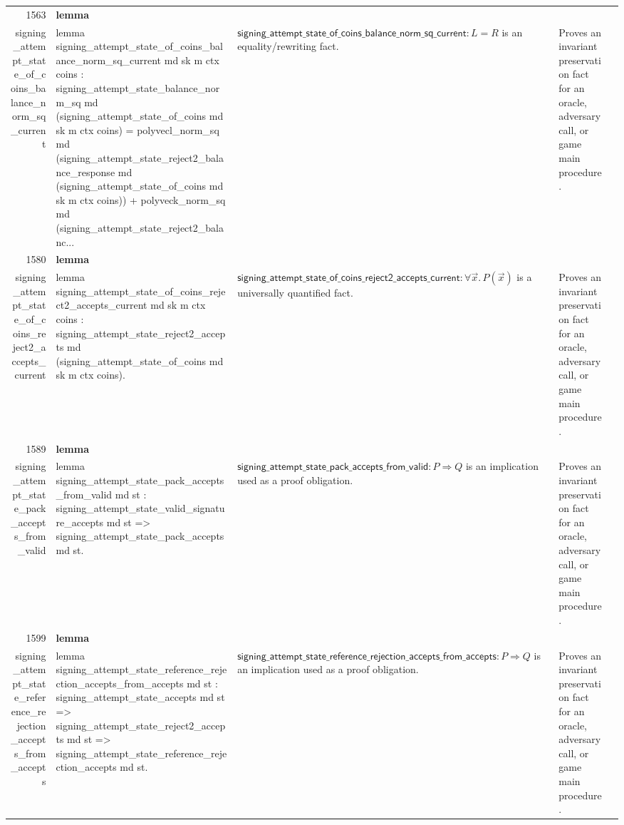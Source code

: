 \documentclass[10pt]{article}
\newcommand{\ec}[1]{\begingroup\ttfamily\scriptsize #1\endgroup}
\begin{document}
\begin{longtable}{r L{0.17\textwidth} L{0.26\textwidth} L{0.27\textwidth} L{0.20\textwidth}}
1563 & \textbf{lemma}\\\ec{signing\_attempt\_state\_of\_coins\_balance\_norm\_sq\_current} & \ec{lemma signing\_attempt\_state\_of\_coins\_balance\_norm\_sq\_current md sk m ctx coins : signing\_attempt\_state\_balance\_norm\_sq md (signing\_attempt\_state\_of\_coins md sk m ctx coins) = polyvecl\_norm\_sq md (signing\_attempt\_state\_reject2\_balance\_response md (signing\_attempt\_state\_of\_coins md sk m ctx coins)) + polyveck\_norm\_sq md (signing\_attempt\_state\_reject2\_balanc...} & \(\mathsf{signing\_attempt\_state\_of\_coins\_balance\_norm\_sq\_current} : L = R\) is an equality/rewriting fact. & Proves an invariant preservation fact for an oracle, adversary call, or game main procedure. \\
1580 & \textbf{lemma}\\\ec{signing\_attempt\_state\_of\_coins\_reject2\_accepts\_current} & \ec{lemma signing\_attempt\_state\_of\_coins\_reject2\_accepts\_current md sk m ctx coins : signing\_attempt\_state\_reject2\_accepts md (signing\_attempt\_state\_of\_coins md sk m ctx coins).} & \(\mathsf{signing\_attempt\_state\_of\_coins\_reject2\_accepts\_current} : \forall \vec{x}.\, P(\vec{x})\) is a universally quantified fact. & Proves an invariant preservation fact for an oracle, adversary call, or game main procedure. \\
1589 & \textbf{lemma}\\\ec{signing\_attempt\_state\_pack\_accepts\_from\_valid} & \ec{lemma signing\_attempt\_state\_pack\_accepts\_from\_valid md st : signing\_attempt\_state\_valid\_signature\_accepts md st => signing\_attempt\_state\_pack\_accepts md st.} & \(\mathsf{signing\_attempt\_state\_pack\_accepts\_from\_valid} : P \Rightarrow Q\) is an implication used as a proof obligation. & Proves an invariant preservation fact for an oracle, adversary call, or game main procedure. \\
1599 & \textbf{lemma}\\\ec{signing\_attempt\_state\_reference\_rejection\_accepts\_from\_accepts} & \ec{lemma signing\_attempt\_state\_reference\_rejection\_accepts\_from\_accepts md st : signing\_attempt\_state\_accepts md st => signing\_attempt\_state\_reject2\_accepts md st => signing\_attempt\_state\_reference\_rejection\_accepts md st.} & \(\mathsf{signing\_attempt\_state\_reference\_rejection\_accepts\_from\_accepts} : P \Rightarrow Q\) is an implication used as a proof obligation. & Proves an invariant preservation fact for an oracle, adversary call, or game main procedure. \\

\end{longtable}
\end{document}
